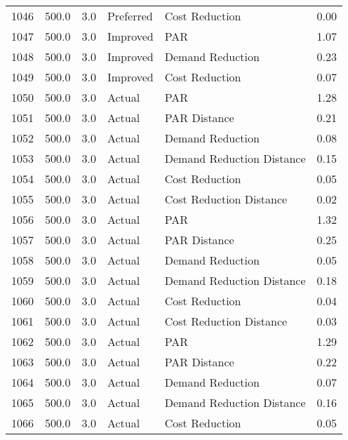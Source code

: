 \begin{longtable}{lrrllr}
1046 &        500.0 &     3.0 &      Preferred &             Cost Reduction &   0.00 \\
1047 &        500.0 &     3.0 &       Improved &                        PAR &   1.07 \\
1048 &        500.0 &     3.0 &       Improved &           Demand Reduction &   0.23 \\
1049 &        500.0 &     3.0 &       Improved &             Cost Reduction &   0.07 \\
1050 &        500.0 &     3.0 &         Actual &                        PAR &   1.28 \\
1051 &        500.0 &     3.0 &         Actual &               PAR Distance &   0.21 \\
1052 &        500.0 &     3.0 &         Actual &           Demand Reduction &   0.08 \\
1053 &        500.0 &     3.0 &         Actual &  Demand Reduction Distance &   0.15 \\
1054 &        500.0 &     3.0 &         Actual &             Cost Reduction &   0.05 \\
1055 &        500.0 &     3.0 &         Actual &    Cost Reduction Distance &   0.02 \\
1056 &        500.0 &     3.0 &         Actual &                        PAR &   1.32 \\
1057 &        500.0 &     3.0 &         Actual &               PAR Distance &   0.25 \\
1058 &        500.0 &     3.0 &         Actual &           Demand Reduction &   0.05 \\
1059 &        500.0 &     3.0 &         Actual &  Demand Reduction Distance &   0.18 \\
1060 &        500.0 &     3.0 &         Actual &             Cost Reduction &   0.04 \\
1061 &        500.0 &     3.0 &         Actual &    Cost Reduction Distance &   0.03 \\
1062 &        500.0 &     3.0 &         Actual &                        PAR &   1.29 \\
1063 &        500.0 &     3.0 &         Actual &               PAR Distance &   0.22 \\
1064 &        500.0 &     3.0 &         Actual &           Demand Reduction &   0.07 \\
1065 &        500.0 &     3.0 &         Actual &  Demand Reduction Distance &   0.16 \\
1066 &        500.0 &     3.0 &         Actual &             Cost Reduction &   0.05 \\

\end{longtable}
